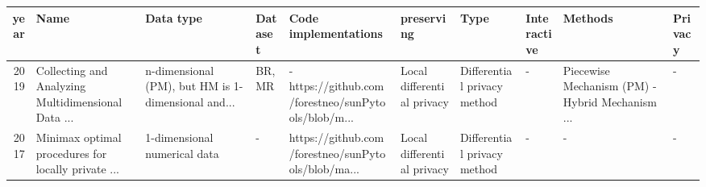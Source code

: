 \begin{landscape}
\begin{table}[ht]
\begin{adjustbox}{width=1.8\textwidth}
      \begin{tabular}{rlllllllll}
        \toprule
        year                                & Name                                               & Data type                                          & Dataset                                            & Code implementations                               & preserving                 & Type                        & Interactive     & Methods                  & Privacy                         \\
        \midrule
        2019 \citep{wang_collecting_2019}   & Collecting and Analyzing Multidimensional Data ... & n-dimensional (PM), but HM is 1-dimensional and... & BR, MR                                             & -https://github.com/forestneo/sunPytools/blob/m... & Local differential privacy & Differential privacy method & -               & Piecewise Mechanism (PM)
        - Hybrid Mechanism ...              & -                                                                                                                                                                                                                                                                                                                                                           \\
        2017 \citep{duchi_minimax_2017}     & Minimax optimal procedures for locally private ... & 1-dimensional numerical data                       & -                                                  & https://github.com/forestneo/sunPytools/blob/ma... & Local differential privacy & Differential privacy method & -               & -                        & -                               \\

\end{tabular}
\end{adjustbox}
\end{table}
\end{landscape}
